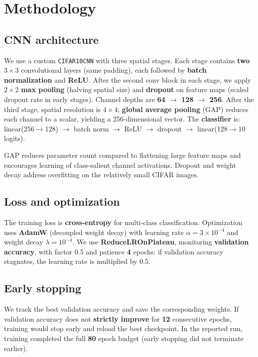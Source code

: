 \documentclass[11pt,a4paper]{article}
\begin{document}
\section{Methodology}
\label{sec:method}

\subsection{CNN architecture}
\label{sec:arch}
We use a custom \texttt{CIFAR10CNN} with three spatial stages. Each stage contains \textbf{two} $3\times 3$ convolutional layers (same padding), each followed by \textbf{batch normalization} and \textbf{ReLU}. After the second conv block in each stage, we apply $2\times 2$ \textbf{max pooling} (halving spatial size) and \textbf{dropout} on feature maps (scaled dropout rate in early stages). Channel depths are \textbf{64 $\to$ 128 $\to$ 256}. After the third stage, spatial resolution is $4\times 4$; \textbf{global average pooling} (GAP) reduces each channel to a scalar, yielding a 256-dimensional vector. The \textbf{classifier} is: linear(256$\to$128) $\to$ batch norm $\to$ ReLU $\to$ dropout $\to$ linear(128$\to$10 logits).

GAP reduces parameter count compared to flattening large feature maps and encourages learning of class-salient channel activations. Dropout and weight decay address overfitting on the relatively small CIFAR images.

\subsection{Loss and optimization}
The training loss is \textbf{cross-entropy} for multi-class classification. Optimization uses \textbf{AdamW} (decoupled weight decay) with learning rate $\alpha = 3\times 10^{-4}$ and weight decay $\lambda = 10^{-4}$. We use \textbf{ReduceLROnPlateau}, monitoring \textbf{validation accuracy}, with factor $0.5$ and patience \textbf{4} epochs: if validation accuracy stagnates, the learning rate is multiplied by $0.5$.

\subsection{Early stopping}
We track the best validation accuracy and save the corresponding weights. If validation accuracy does not \textbf{strictly improve} for \textbf{12} consecutive epochs, training would stop early and reload the best checkpoint. In the reported run, training completed the full \textbf{80} epoch budget (early stopping did not terminate earlier).
\end{document}
